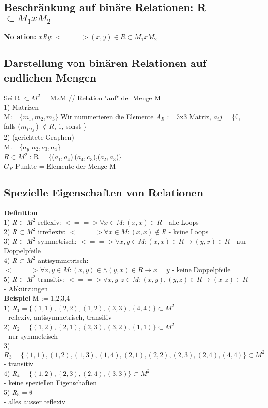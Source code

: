 \documentclass[11pt,a4paper]{article}
\begin{document}
\subsection{Beschränkung auf binäre Relationen: R $\subset M_1xM_2$}
\textbf{Notation:} $ xRy : <==> (x,y) \in R \subset M_1 x M_2$ \\
\subsection{Darstellung von binären Relationen auf endlichen Mengen}
Sei {R} $\subset M^2$ = MxM // Relation "auf" der Menge M \\
1) Matrizen\\
M:= \{$m_1,m_2,m_3$\} Wir nummerieren die Elemente
$A_R$ := 3x3 Matrix, $a_ij$ = \{0, falls ($m_i$,$,_j$) $\not\in R$, 1, sonst \}\\
2) (gerichtete Graphen) \\
M:= \{$a_y,a_2,a_3,a_4$\}\\
$R\subset M^2$ : R = \{($a_1,a_4$),($a_4,a_3$),($a_2,a_3$)\}\\
$G_R$ Punkte = Elemente der Menge M

\subsection{Spezielle Eigenschaften von Relationen}
\textbf{Definition}\\
1) $R \subset M^2$ reflexiv: $<==> \forall x \in M : (x,x) \in R$ - alle Loops\\
2) $R \subset M^2$ irreflexiv: $<==> \forall x \in M : (x,x) \not\in R$ - keine Loops\\
3) $R \subset M^2$ symmetrisch: $<==> \forall x,y \in M : (x,x) \in R \rightarrow (y,x) \in R$ - nur Doppelpfeile\\
4) $R \subset M^2$ antisymmetrisch: $<==> \forall x,y \in M : (x,y) \in \wedge (y,x) \in R \rightarrow x=y $ - keine Doppelpfeile\\
5) $R \subset M^2$ transitiv: $<==> \forall x,y,z \in M : (x,y),(y,z) \in R \rightarrow (x,z)\in R$ - Abkürzungen \\

\textbf{Beispiel} M := {1,2,3,4}\\
1) $R_1 = \{ (1,1),(2,2),(1,2),(3,3),(4,4)\} \subset M^2$\\
- reflexiv, antisymmetrisch, transitiv\\
2) $R_2 = \{ (1,2),(2,1),(2,3),(3,2),(1,1)\} \subset M^2$\\
- nur symmetrisch\\
3) $R_3 = \{ (1,1),(1,2),(1,3),(1,4),(2,1),(2,2),(2,3),(2,4),(4,4)\} \subset M^2$\\
- transitiv \\
4) $R_4 = \{ (1,2),(2,3),(2,4),(3,3)\} \subset M^2$\\
- keine speziellen Eigenschaften\\
5) $R_5 = \emptyset $\\
- alles ausser reflexiv
\end{document}
